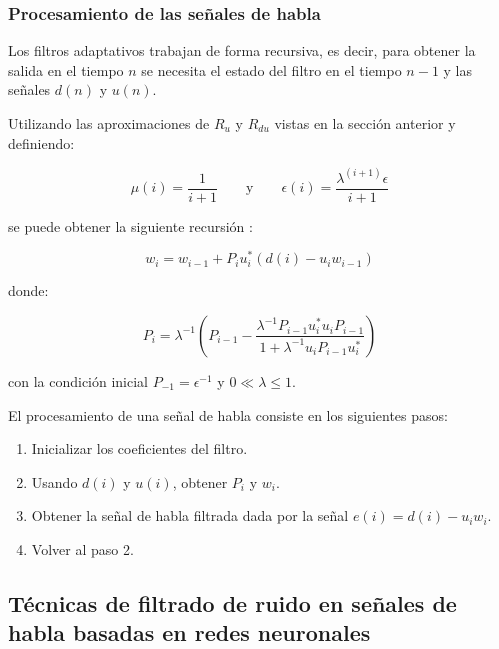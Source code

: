 \subsubsection{Procesamiento de las señales de habla}
\label{sec:filtro_adaptativo_procesamiento_de_señales}

Los filtros adaptativos trabajan de forma recursiva, es decir, para obtener la salida en el tiempo $n$ se necesita el estado del filtro en el tiempo $n-1$ y las señales $d(n)$ y $u(n)$. 

Utilizando las aproximaciones de $R_u$ y $R_{du}$ vistas en la sección anterior y definiendo:

\begin{equation*}
	\mu(i) = \frac{1}{i+1} \qquad \text{y} \qquad \epsilon(i) = \frac{\lambda^(i+1) \epsilon}{i + 1}
\end{equation*}

se puede obtener la siguiente recursión \cite{fundamentals_of_adaptive_filtering}:

\begin{equation*}
	w_i = w_{i-1} + P_i u_i^* \left( d(i) - u_i w_{i-1} \right)
\end{equation*}

donde:

\begin{equation*}
	P_i = \lambda^{-1} \left(P_{i-1} - \frac{\lambda^{-1} P_{i-1} u_i^* u_i P_{i-1}}{1 + \lambda^{-1} u_i P_{i-1} u_i^*} \right)
\end{equation*}

con la condición inicial $P_{-1}=\epsilon^{-1}$ y $ 0 \ll \lambda \le 1$.

El procesamiento de una señal de habla consiste en los siguientes pasos:

\begin{enumerate}
	\item Inicializar los coeficientes del filtro.
	\item Usando $d(i)$ y $u(i)$, obtener $P_i$ y $w_i$.
	\item Obtener la señal de habla filtrada dada por la señal $e(i) = d(i) - u_i w_i $.
	\item Volver al paso 2.
\end{enumerate}

\subsection{Técnicas de filtrado de ruido en señales de habla basadas en redes neuronales}
\label{sec:tecnicas_filtrado_redes_neuronales}

